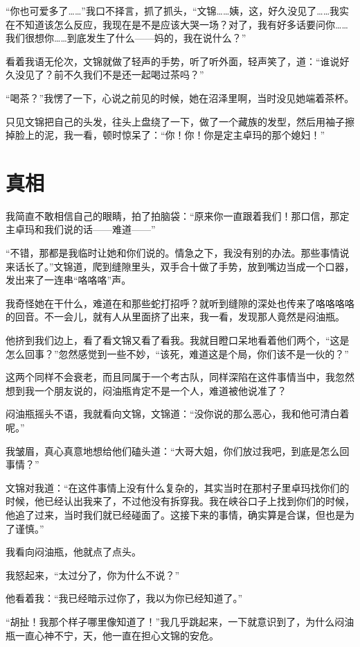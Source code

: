 “你也可爱多了……”我口不择言，抓了抓头，“文锦……姨，这，好久没见了……我实在不知道该怎么反应，我现在是不是应该大哭一场？对了，我有好多话要问你……我们很想你……到底发生了什么——妈的，我在说什么？”

看着我语无伦次，文锦就做了轻声的手势，听了听外面，轻声笑了，道：“谁说好久没见了？前不久我们不是还一起喝过茶吗？”

“喝茶？”我愣了一下，心说之前见的时候，她在沼泽里啊，当时没见她端着茶杯。

只见文锦把自己的头发，往头上盘绕了一下，做了一个藏族的发型，然后用袖子擦掉脸上的泥，我一看，顿时惊呆了：“你！你！你是定主卓玛的那个媳妇！”

\chapter{真相}

我简直不敢相信自己的眼睛，拍了拍脑袋：“原来你一直跟着我们！那口信，那定主卓玛和我们说的话——难道——”

“不错，那都是我临时让她和你们说的。情急之下，我没有别的办法。那些事情说来话长了。”文锦道，爬到缝隙里头，双手合十做了手势，放到嘴边当成一个口器，发出来了一连串“咯咯咯”声。

我奇怪她在干什么，难道在和那些蛇打招呼？就听到缝隙的深处也传来了咯咯咯咯的回音。不一会儿，就有人从里面挤了出来，我一看，发现那人竟然是闷油瓶。

他挤到我们边上，看了看文锦又看了看我。我就目瞪口呆地看着他们两个，“这是怎么回事？”忽然感觉到一些不妙，“该死，难道这是个局，你们该不是一伙的？”

这两个同样不会衰老，而且同属于一个考古队，同样深陷在这件事情当中，我忽然想到我一个朋友说的，闷油瓶肯定不是一个人，难道被他说准了？

闷油瓶摇头不语，我就看向文锦，文锦道：“没你说的那么恶心，我和他可清白着呢。”

我皱眉，真心真意地想给他们磕头道：“大哥大姐，你们放过我吧，到底是怎么回事情？”

文锦对我道：“在这件事情上没有什么复杂的，其实当时在那村子里卓玛找你们的时候，他已经认出我来了，不过他没有拆穿我。我在峡谷口子上找到你们的时候，他追了过来，当时我们就已经碰面了。这接下来的事情，确实算是合谋，但也是为了谨慎。”

我看向闷油瓶，他就点了点头。

我怒起来，“太过分了，你为什么不说？”

他看着我：“我已经暗示过你了，我以为你已经知道了。”

“胡扯！我那个样子哪里像知道了！”我几乎跳起来，一下就意识到了，为什么闷油瓶一直心神不宁，天，他一直在担心文锦的安危。

